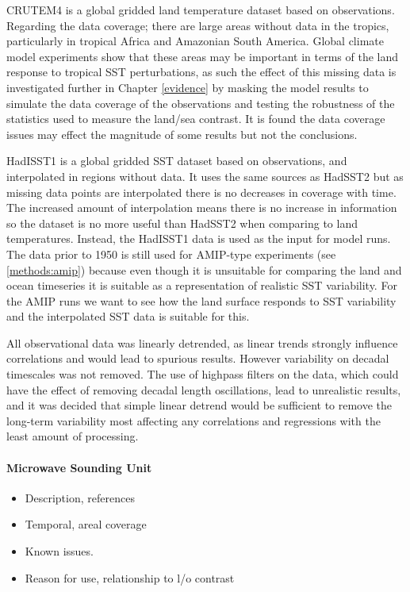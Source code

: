 CRUTEM4 is a global gridded land temperature dataset based on observations.  
Regarding the data coverage; there are large areas without data in the tropics, 
particularly in tropical Africa and Amazonian South America. Global climate 
model experiments show that these areas may be important in terms of the land 
response to tropical SST perturbations, as such the effect of this missing data 
is investigated further in Chapter \ref{evidence} by masking the model results 
to simulate the data coverage of the observations and testing the robustness of 
the statistics used to measure the land/sea contrast. It is found the data 
coverage issues may effect the magnitude of some results but not the 
conclusions.

HadISST1 is a global gridded SST dataset based on observations, and interpolated 
in regions without data. It uses the same sources as HadSST2 but as missing data 
points are interpolated there is no decreases in coverage with time. The 
increased amount of interpolation means there is no increase in information so 
the dataset is no more useful than HadSST2 when comparing to land temperatures.  
Instead, the HadISST1 data is used as the input for model runs. The data prior 
to 1950 is still used for AMIP-type experiments (see \ref{methods:amip}) because 
even though it is unsuitable for comparing the land and ocean timeseries	it 
is suitable as a representation of realistic SST variability. For the AMIP runs 
we want to see how the land surface responds to SST variability and the 
interpolated SST data is suitable for this.

All observational data was linearly detrended, as linear trends strongly 
influence correlations and would lead to spurious results. However variability 
on decadal timescales was not removed. The use of highpass filters on the data, 
which could have the effect of removing decadal length oscillations, lead to 
unrealistic results, and it was decided that simple linear detrend would be 
sufficient to remove the long-term variability most affecting any correlations 
and regressions with the least amount of processing.

\paragraph{Microwave Sounding Unit}
\begin{itemize}
	\item Description, references
	\item Temporal, areal coverage
	\item Known issues.
	\item Reason for use, relationship to l/o contrast
\end{itemize}


